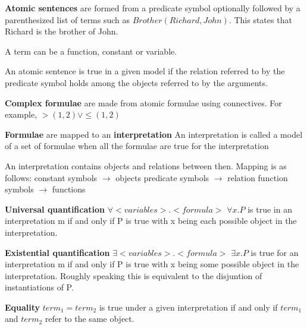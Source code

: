 \documentclass{article}
\begin{document}
\textbf{Atomic sentences} are formed from a predicate symbol optionally followed by a parenthesized list of terms such as $Brother(Richard,John)$. This states that Richard is the brother of John.

A term can be a function, constant or variable. \newline

An atomic sentence is true in a given model if the relation referred to by the predicate symbol holds among the objects referred to by the arguments. \newline 

\textbf{Complex formulae} are made from atomic formulae using connectives. For example, $>(1,2) \vee \leq(1,2)$ \newline

\textbf{Formulae} are mapped to an \textbf{interpretation} \newline 
An interpretation is called a model of a set of formulae when all the formulae are true for the interpretation \newline

An interpretation contains objects and relations between then. Mapping is as follows:
constant symbols $\rightarrow$ objects
predicate symbols $\rightarrow$ relation
function symbols $\rightarrow$ functions \newline 

\textbf{Universal quantification}
$\forall <variables>.<formula>$
$\forall x.P$ is true in an interpretation m if and only if P is true with x being each possible object in the interpretation. \newline

\textbf{Existential quantification}
$\exists <variables>.<formula>$
$\exists x. P$ is true for an interpretation m if and only if P is true with x being some possible object in the interpretation. Roughly speaking this is equivalent to the disjuntion of instantiations of P. \newline

\textbf{Equality}
$term_1 = term_2$ is true under a given interpretation if and only if $term_1$ and $term_2$ refer to the same object. \newline
\end{document}
